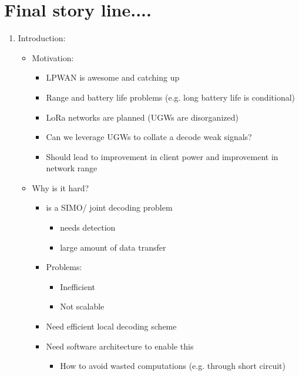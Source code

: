 \section*{Final story line....}

\begin{enumerate}
    \item Introduction:
        \begin{itemize}
            \item Motivation:
                \begin{itemize}
                    \item LPWAN is awesome and catching up
                    \item Range and battery life problems (e.g. long battery life is conditional)
                    \item LoRa networks are planned (UGWs are disorganized)
                    \item Can we leverage UGWs to collate a decode weak signals?
                    \item Should lead to improvement in client power and improvement in network range
                \end{itemize}
            \item Why is it hard?
                \begin{itemize}
                    \item is a SIMO/ joint decoding problem
                        \begin{itemize}
                            \item needs detection
                            \item large amount of data transfer
                        \end{itemize}
                    \item Problems:
                        \begin{itemize}
                            \item Inefficient
                            \item Not scalable
                        \end{itemize}
                    \item Need efficient local decoding scheme
                    \item Need software architecture to enable this
                        \begin{itemize}
                            \item How to avoid wasted computations (e.g. through short circuit)

\end{itemize}
\end{itemize}
\end{itemize}
\end{enumerate}

